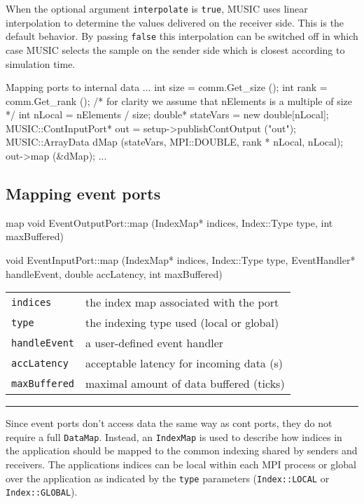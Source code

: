 \documentclass[a4paper,twoside]{report}
\makeatletter
\newenvironment{parameters}%
{\begin{tabular}{@{\hspace{2em}}lp{0.6\textwidth}}}%
{\end{tabular}\par\vspace{1mm}\par\hrule\par\vspace{5mm}}
\makeatother
\begin{document}
When the optional argument \lstinline|interpolate| is
\lstinline|true|, MUSIC uses linear interpolation to determine the
values delivered on the receiver side.  This is the default behavior.
By passing \lstinline|false| this interpolation can be switched off in
which case MUSIC selects the sample on the sender side which is
closest according to simulation time.


\clearpage
\begin{code}{Mapping ports to internal data\label{code:mapping}}
{
  ...
  int size = comm.Get_size ();
  int rank = comm.Get_rank ();
  /* for clarity we assume that nElements
     is a multiple of size */
  int nLocal = nElements / size;
  double* stateVars = new double[nLocal];
  MUSIC::ContInputPort* out =
     setup->publishContOutput ("out");
  MUSIC::ArrayData dMap (stateVars, MPI::DOUBLE,
                         rank * nLocal, nLocal);
  out->map (&dMap);
  ...
}
\end{code}


\subsection{Mapping event ports}

\begin{head}{map}
  void EventOutputPort::map (IndexMap* indices,
                             Index::Type type,
                             int maxBuffered)

  void EventInputPort::map (IndexMap* indices,
                            Index::Type type,
                            EventHandler* handleEvent,
                            double accLatency,
                            int maxBuffered)
\end{head}
\begin{parameters}
  \lstinline|indices| & the index map associated with the port \\
  \lstinline|type| & the indexing type used (local or global) \\
  \lstinline|handleEvent| & a user-defined event handler \\
  \lstinline|accLatency| & acceptable latency for incoming data (s) \\
  \lstinline|maxBuffered| & maximal amount of data buffered (ticks) \\
\end{parameters}

Since event ports don't access data the same way as cont ports, they
do not require a full \lstinline|DataMap|.  Instead, an
\lstinline|IndexMap| is used to describe how indices in the
application should be mapped to the common indexing shared by
senders and receivers.  The applications indices can be local within
each MPI process or global over the application as indicated by the
\lstinline|type| parameters (\lstinline|Index::LOCAL| or
\lstinline|Index::GLOBAL|).
\end{document}
